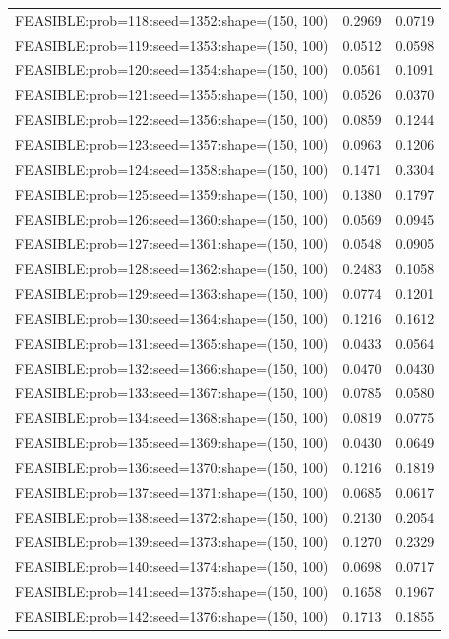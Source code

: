 \begin{longtable}{lcc}
FEASIBLE:prob=118:seed=1352:shape=(150, 100) &   0.2969 & 0.0719 \\
FEASIBLE:prob=119:seed=1353:shape=(150, 100) &   0.0512 & 0.0598 \\
FEASIBLE:prob=120:seed=1354:shape=(150, 100) &   0.0561 & 0.1091 \\
FEASIBLE:prob=121:seed=1355:shape=(150, 100) &   0.0526 & 0.0370 \\
FEASIBLE:prob=122:seed=1356:shape=(150, 100) &   0.0859 & 0.1244 \\
FEASIBLE:prob=123:seed=1357:shape=(150, 100) &   0.0963 & 0.1206 \\
FEASIBLE:prob=124:seed=1358:shape=(150, 100) &   0.1471 & 0.3304 \\
FEASIBLE:prob=125:seed=1359:shape=(150, 100) &   0.1380 & 0.1797 \\
FEASIBLE:prob=126:seed=1360:shape=(150, 100) &   0.0569 & 0.0945 \\
FEASIBLE:prob=127:seed=1361:shape=(150, 100) &   0.0548 & 0.0905 \\
FEASIBLE:prob=128:seed=1362:shape=(150, 100) &   0.2483 & 0.1058 \\
FEASIBLE:prob=129:seed=1363:shape=(150, 100) &   0.0774 & 0.1201 \\
FEASIBLE:prob=130:seed=1364:shape=(150, 100) &   0.1216 & 0.1612 \\
FEASIBLE:prob=131:seed=1365:shape=(150, 100) &   0.0433 & 0.0564 \\
FEASIBLE:prob=132:seed=1366:shape=(150, 100) &   0.0470 & 0.0430 \\
FEASIBLE:prob=133:seed=1367:shape=(150, 100) &   0.0785 & 0.0580 \\
FEASIBLE:prob=134:seed=1368:shape=(150, 100) &   0.0819 & 0.0775 \\
FEASIBLE:prob=135:seed=1369:shape=(150, 100) &   0.0430 & 0.0649 \\
FEASIBLE:prob=136:seed=1370:shape=(150, 100) &   0.1216 & 0.1819 \\
FEASIBLE:prob=137:seed=1371:shape=(150, 100) &   0.0685 & 0.0617 \\
FEASIBLE:prob=138:seed=1372:shape=(150, 100) &   0.2130 & 0.2054 \\
FEASIBLE:prob=139:seed=1373:shape=(150, 100) &   0.1270 & 0.2329 \\
FEASIBLE:prob=140:seed=1374:shape=(150, 100) &   0.0698 & 0.0717 \\
FEASIBLE:prob=141:seed=1375:shape=(150, 100) &   0.1658 & 0.1967 \\
FEASIBLE:prob=142:seed=1376:shape=(150, 100) &   0.1713 & 0.1855 \\

\end{longtable}
